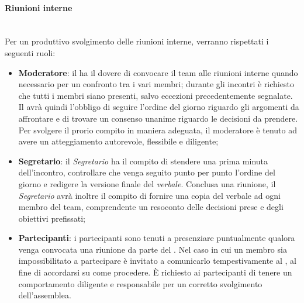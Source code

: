 \paragraph{Riunioni interne}
~\\Per un produttivo svolgimento delle riunioni interne, verranno rispettati i seguenti ruoli:
\begin{itemize}
\item\textbf{Moderatore}: il \RdP{} ha il dovere di convocare il team alle riunioni interne quando necessario per un confronto tra i vari membri;
durante gli incontri è richiesto che tutti i membri siano presenti, salvo eccezioni precedentemente segnalate.
Il \RdP{} avrà quindi l'obbligo di seguire l'ordine del giorno riguardo gli argomenti da affrontare 
e di trovare un consenso unanime riguardo le decisioni da prendere.
Per svolgere il prorio compito in maniera adeguata, il moderatore è tenuto ad avere un atteggiamento autorevole, flessibile
e diligente;
\item\textbf{Segretario}: il \emph{Segretario} ha il compito di stendere una prima minuta dell'incontro, controllare che venga seguito punto per punto l'ordine del giorno e redigere la versione finale del \emph{verbale}.
Conclusa una riunione, il \emph{Segretario} avrà inoltre il compito di fornire una copia del verbale ad ogni membro del team,
comprendente un resoconto delle decisioni prese e degli obiettivi prefissati;
\item\textbf{Partecipanti}: i partecipanti sono tenuti a presenziare puntualmente qualora venga convocata una riunione da parte del \RdP{}. Nel caso in cui un membro sia impossibilitato a partecipare è invitato
a comunicarlo tempestivamente al \RdP, al fine di accordarsi su come procedere. È richiesto ai partecipanti di
tenere un comportamento diligente e responsabile per un corretto svolgimento dell'assemblea.
\end{itemize}

